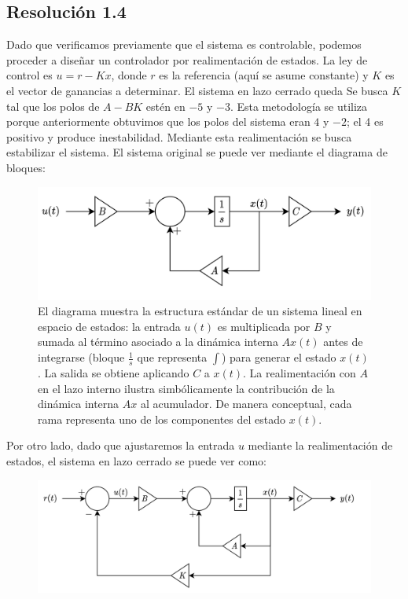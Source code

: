 \documentclass[
  11pt,
  letterpaper,
   addpoints,
  answers
  ]{exam}
\begin{document}
\begin{questions}
\begin{solution}
  \subsection*{Resolución 1.4}
  Dado que verificamos previamente que el sistema es controlable, podemos proceder a diseñar un controlador por realimentación de estados. La ley de control es $u = r - Kx$, donde $r$ es la referencia (aquí se asume constante) y $K$ es el vector de ganancias a determinar. El sistema en lazo cerrado queda
  Se busca $K$ tal que los polos de $A-BK$ estén en $-5$ y $-3$. Esta metodología se utiliza porque anteriormente obtuvimos que los polos del sistema eran $4$ y $-2$; el 4 es positivo y produce inestabilidad. Mediante esta realimentación se busca estabilizar el sistema. El sistema original se puede ver mediante el diagrama de bloques:
  \begin{figure}[H]\centering
    \includegraphics[width=.9\textwidth]{../figures/Auxiliar_4_1.png}
    \caption{El diagrama muestra la estructura estándar de un sistema lineal en espacio de estados: la entrada $u(t)$ es multiplicada por $B$ y sumada al término asociado a la dinámica interna $Ax(t)$ antes de integrarse (bloque $\tfrac{1}{s}$ que representa $\int$) para generar el estado $x(t)$. La salida se obtiene aplicando $C$ a $x(t)$. La realimentación con $A$ en el lazo interno ilustra simbólicamente la contribución de la dinámica interna $Ax$ al acumulador. De manera conceptual, cada rama representa uno de los componentes del estado $x(t)$.}
  \end{figure} 
Por otro lado, dado que ajustaremos la entrada $u$ mediante la realimentación de estados, el sistema en lazo cerrado se puede ver como:
 \begin{figure}[H]\centering
    \includegraphics[width=.9\textwidth]{../figures/Auxiliar_4_2.png}

\end{figure}
\end{solution}
\end{questions}
\end{document}
